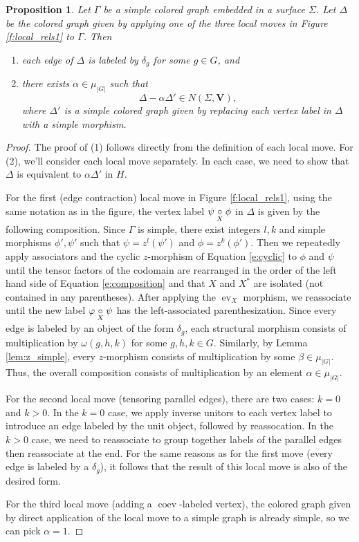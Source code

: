 \documentclass{amsart}
\newtheorem{prop}[thm]{Proposition}
\DeclareMathOperator{\coev}{coev}
\DeclareMathOperator{\ev}{ev}
\newcommand{\VV}{\mathbf{V}}       %
\newcommand{\ph}{\varphi}
\begin{document}
\begin{prop} \label{prop:omega}
Let $\Gamma$ be a simple colored graph embedded in a surface $\Sigma$.  Let $\Delta$ be the colored graph given by applying one of the three local moves in Figure \ref{f:local_rels1} to $\Gamma$.  Then
\begin{enumerate}
\item  each edge of $\Delta$ is labeled by $\delta_g$ for some $g \in G$, and
\item  there exists $\alpha \in \mu_{|G|}$ such that 
$$\Delta - \alpha \Delta' \in N(\Sigma, \VV),$$
where $\Delta'$ is a simple colored graph given by replacing each vertex label in $\Delta$ with a simple morphism.
\end{enumerate}
\end{prop}
\begin{proof}
The proof of (1) follows directly from the definition  of each local move. For (2), we'll consider each local move separately.  In each case, we need to show that $\Delta$ is equivalent to $\alpha \Delta'$ in $H$.  

For the first (edge contraction) local move in Figure \ref{f:local_rels1},  using the same notation as in the figure, the vertex label $\psi \underset{\scriptstyle X}{\circ} \phi$ in $\Delta$ is given by the following composition.  Since $\Gamma$ is simple, there exist integers $l,k$ and simple morphisms $\phi', \psi'$ such that $\psi = z^l(\psi')$ and $\phi = z^k(\phi')$. Then we repeatedly apply associators and the cyclic $z$-morphism of Equation \ref{e:cyclic} to $\phi$ and $\psi$ until the tensor factors of the codomain are rearranged in the order of the left hand side of Equation \ref{e:composition} and that $X$ and $X^*$ are isolated (not contained in any parentheses).  After applying the $\ev_X$ morphism, we reassociate until the new label $\ph\cc{X}\psi$ has the left-associated parenthesization.  Since every edge is labeled by an object of the form $\delta_g$, each structural morphism consists of multiplication by $\omega(g,h,k)$ for some $g,h,k \in G$.  Similarly, by Lemma \ref{lem:z_simple}, every $z$-morphism consists of multiplication by some $\beta \in \mu_{|G|}$.  Thus, the overall composition consists of multiplication by an element $\alpha \in \mu_{|G|}$.

For the second local move (tensoring parallel edges), there are two cases: $k = 0$ and $k > 0$.  In the $k = 0$ case,  we apply inverse unitors to each vertex label to introduce an edge labeled by the unit object, followed by reassocation.  In the $k > 0$ case, we need to reassociate to group together labels of the parallel edges then reassociate at the end.  For the same reasons as for the first move (every edge is labeled by a $\delta_g$), it follows that the result of this local move is also of the desired form.

For the third local move (adding a $\coev$-labeled vertex), the colored graph given by direct application of the local move to a simple graph is already simple, so we can pick $\alpha = 1$.  
\end{proof}
\end{document}
